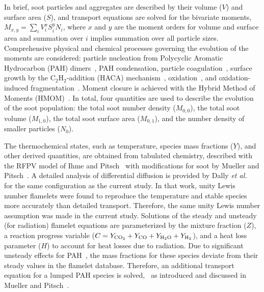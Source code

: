 \documentclass[review,3p,times]{elsarticle}
\begin{document}
In brief, soot particles and aggregates are described by their volume ($V$) and surface area ($S$), and transport equations are solved for the bivariate moments, $M_{x,y} = \sum_i{V_i^x S_i^y N_i}$, where $x$ and $y$ are the moment orders for volume and surface area and summation over $i$ implies summation over all particle sizes.  Comprehensive physical and chemical processes governing the evolution of the moments are considered: particle nucleation from Polycyclic Aromatic Hydrocarbon (PAH) dimers~\cite{schuetz02,wong09,blanquart09c}, PAH condensation, particle coagulation~\cite{mueller09b}, surface growth by the C$_2$H$_2$-addition (HACA) mechanism~\cite{frenklach91}, oxidation~\cite{kazakov95,neoh81}, and oxidation-induced fragmentation~\cite{mueller11a}.  Moment closure is achieved with the Hybrid Method of Moments (HMOM)~\cite{mueller09b}.  In total, four quantities are used to describe the evolution of the soot population: the total soot number density ($M_{0,0}$), the total soot volume ($M_{1,0}$), the total soot surface area ($M_{0,1}$), and the number density of smaller particles ($N_0$).

The thermochemical states, such as temperature, species mass fractions ($Y$), and other derived quantities, are obtained from tabulated chemistry, described with the RFPV model of Ihme and Pitsch~\cite{ihme08} with modifications for soot by Mueller and Pitsch~\cite{mueller12}.  \textcolor{Rv1}{A detailed analysis of differential diffusion is provided by Dally \emph{et al.}~\cite{dally98b} for the same configuration as the current study.  In that work, unity Lewis number flamelets were found to reproduce the temperature and stable species more accurately than detailed transport.  Therefore, the same unity Lewis number assumption was made in the current study.}  Solutions of the steady and unsteady (for radiation) flamelet equations are parameterized by the mixture fraction ($Z$), a reaction progress variable ($C = Y_{\rm CO_2} + Y_{\rm CO} + Y_{\rm H_2O} + Y_{\rm H_2}$), and a heat loss parameter ($H$) to account for heat losses due to radiation.  Due to significant unsteady effects for PAH~\cite{bisetti12}, the mass fractions for these species deviate from their steady values in the flamelet database.  Therefore, an additional transport equation for a lumped PAH species is solved, ~\textcolor{Rv1}{as introduced and discussed in Mueller and Pitsch~\cite{mueller12}}.
\end{document}
